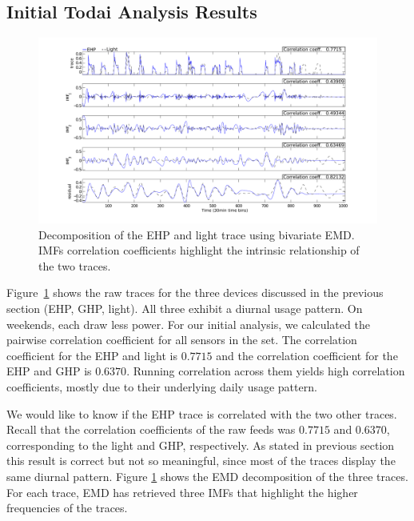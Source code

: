 \subsection{Initial Todai Analysis Results}


\begin{figure}[th!]
\hspace{-2cm}
\includegraphics[width=1.2\textwidth]{figs/emd_25_26-eps-converted-to}
\vspace{-1cm}
\caption{Decomposition of the EHP and light trace using bivariate EMD. IMFs correlation coefficients highlight the intrinsic relationship of the two traces.}
\label{fig:emd}
\end{figure}

Figure~\ref{fig:emd} shows the raw traces for the three devices discussed in 
the previous section (EHP, GHP, light). All three exhibit a diurnal usage pattern.  On weekends, each
draw less power.   For our initial analysis, we calculated the pairwise 
correlation coefficient for all sensors in the set.  The correlation coefficient for 
 the EHP and light is $0.7715$ and the correlation coefficient for the EHP and GHP is $0.6370$.
Running correlation across them yields high correlation coefficients, mostly
due to their underlying daily usage pattern.

We would like to know if the EHP trace is correlated with the two other traces.
Recall that the correlation coefficients of the raw feeds was $0.7715$ and $0.6370$, corresponding to the light 
and GHP, respectively.
As stated in previous section this result is correct but not so meaningful, since most of the traces
display the same diurnal pattern.
Figure \ref{fig:emd} shows the EMD decomposition of the three traces.
For each trace, EMD has retrieved three IMFs that highlight the higher frequencies of the traces.


